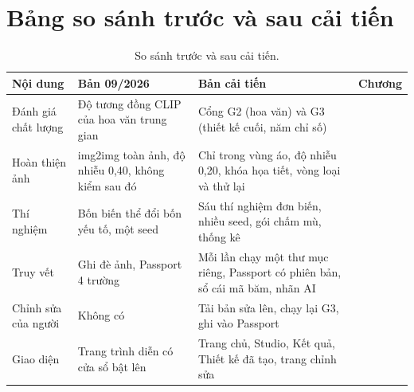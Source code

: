
\section{Bảng so sánh trước và sau cải tiến}

\begin{table}[htbp]
\centering
\small
\begin{tabularx}{\textwidth}{>{\raggedright\arraybackslash}p{3.0cm}>{\raggedright\arraybackslash}X>{\raggedright\arraybackslash}X>{\raggedright\arraybackslash}p{1.6cm}}
\toprule
\textbf{Nội dung} & \textbf{Bản 09/2026} & \textbf{Bản cải tiến} & \textbf{Chương} \\
\midrule
Đánh giá chất lượng & Độ tương đồng CLIP của hoa văn trung gian & Cổng G2 (hoa văn) và G3 (thiết kế cuối, năm chỉ số) & 4 \\
Hoàn thiện ảnh & img2img toàn ảnh, độ nhiễu 0,40, không kiểm sau đó & Chỉ trong vùng áo, độ nhiễu 0,20, khóa họa tiết, vòng loại và thử lại & 4 \\
Thí nghiệm & Bốn biến thể đổi bốn yếu tố, một seed & Sáu thí nghiệm đơn biến, nhiều seed, gói chấm mù, thống kê & 5 \\
Truy vết & Ghi đè ảnh, Passport 4 trường & Mỗi lần chạy một thư mục riêng, Passport có phiên bản, sổ cái mã băm, nhãn AI & 6 \\
Chỉnh sửa của người & Không có & Tải bản sửa lên, chạy lại G3, ghi vào Passport & 6 \\
Giao diện & Trang trình diễn có cửa sổ bật lên & Trang chủ, Studio, Kết quả, Thiết kế đã tạo, trang chỉnh sửa & 3 \\
\bottomrule
\end{tabularx}
\caption{So sánh trước và sau cải tiến.}
\label{tab:truocsau}
\end{table}
